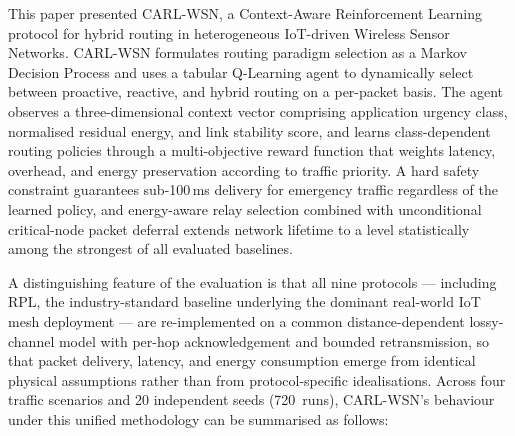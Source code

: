 \documentclass[12pt]{article}
\begin{document}
This paper presented CARL-WSN, a Context-Aware Reinforcement Learning
protocol for hybrid routing in heterogeneous IoT-driven Wireless
Sensor Networks. CARL-WSN formulates routing paradigm selection as a
Markov Decision Process and uses a tabular Q-Learning agent to
dynamically select between proactive, reactive, and hybrid routing on
a per-packet basis. The agent observes a three-dimensional context
vector comprising application urgency class, normalised residual
energy, and link stability score, and learns class-dependent routing
policies through a multi-objective reward function that weights
latency, overhead, and energy preservation according to traffic
priority. A hard safety constraint guarantees sub-100\,ms delivery
for emergency traffic regardless of the learned policy, and
energy-aware relay selection combined with unconditional
critical-node packet deferral extends network lifetime to a level
statistically among the strongest of all evaluated baselines.

A distinguishing feature of the evaluation is that all nine
protocols --- including RPL, the industry-standard baseline
underlying the dominant real-world IoT mesh deployment --- are
re-implemented on a common distance-dependent lossy-channel model
with per-hop acknowledgement and bounded retransmission, so that
packet delivery, latency, and energy consumption emerge from
identical physical assumptions rather than from protocol-specific
idealisations. Across four traffic scenarios and 20 independent
seeds (720~runs), CARL-WSN's behaviour under this unified
methodology can be summarised as follows:
\end{document}
